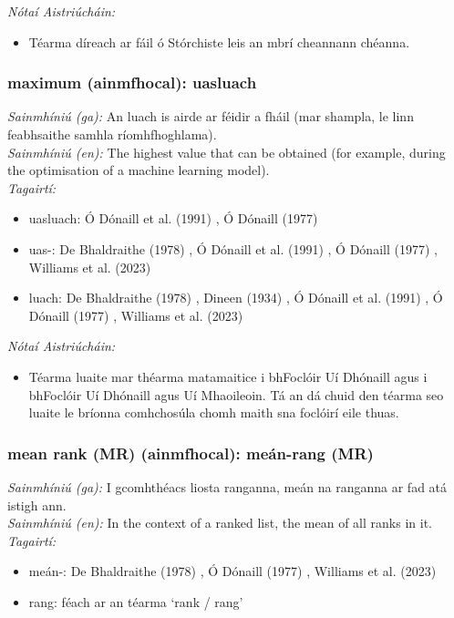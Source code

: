  \noindent \textit{Nótaí Aistriúcháin:}
\begin{itemize}
	\item Téarma díreach ar fáil ó Stórchiste leis an mbrí cheannann chéanna.
\end{itemize}


\subsubsection*{maximum (ainmfhocal): uasluach}
 \noindent \textit{Sainmhíniú (ga):} An luach is airde ar féidir a fháil (mar shampla, le linn feabhsaithe samhla ríomhfhoghlama).
\\
 \noindent \textit{Sainmhíniú (en):} The highest value that can be obtained (for example, during the optimisation of a machine learning model).
\\
 \noindent \textit{Tagairtí:}
\begin{itemize}
	\item uasluach: Ó Dónaill et al. (1991) \cite{focloir-beag}, Ó Dónaill (1977) \cite{odonaill}
	\item uas-: De Bhaldraithe (1978) \cite{de-bhaldraithe}, Ó Dónaill et al. (1991) \cite{focloir-beag}, Ó Dónaill (1977) \cite{odonaill}, Williams et al. (2023) \cite{storchiste}
	\item luach: De Bhaldraithe (1978) \cite{de-bhaldraithe}, Dineen (1934) \cite{dineen}, Ó Dónaill et al. (1991) \cite{focloir-beag}, Ó Dónaill (1977) \cite{odonaill}, Williams et al. (2023) \cite{storchiste}
\end{itemize}

 \noindent \textit{Nótaí Aistriúcháin:}
\begin{itemize}
	\item Téarma luaite mar théarma matamaitice i bhFoclóir Uí Dhónaill agus i bhFoclóir Uí Dhónaill agus Uí Mhaoileoin. Tá an dá chuid den téarma seo luaite le bríonna comhchosúla chomh maith sna foclóirí eile thuas.
\end{itemize}


\subsubsection*{mean rank (MR) (ainmfhocal): meán-rang (MR)}
 \noindent \textit{Sainmhíniú (ga):} I gcomhthéacs liosta ranganna, meán na ranganna ar fad atá istigh ann.
\\
 \noindent \textit{Sainmhíniú (en):} In the context of a ranked list, the mean of all ranks in it.
\\
 \noindent \textit{Tagairtí:}
\begin{itemize}
	\item meán-: De Bhaldraithe (1978) \cite{de-bhaldraithe}, Ó Dónaill (1977) \cite{odonaill}, Williams et al. (2023) \cite{storchiste}
	\item rang: féach ar an téarma `rank / rang'
\end{itemize}

